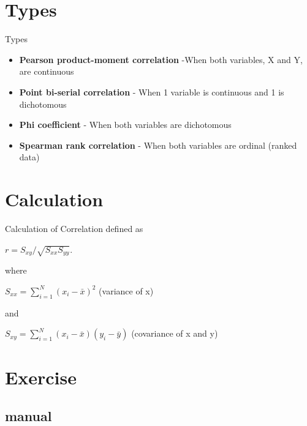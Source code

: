 \documentclass[slidestop,compress,14pt,xcolor=dvipsnames]{beamer}\usepackage[]{graphicx}\usepackage[]{color}
\begin{document}
\section{Types}
\begin{frame}{Types}
\begin{itemize}
  \item {\bf Pearson product-moment correlation} -When both variables, X and Y, are continuous
  \item {\bf Point bi-serial correlation} - When 1 variable is continuous and 1 is dichotomous
  \item {\bf Phi coefficient} - When both variables are dichotomous
  \item {\bf Spearman rank correlation} - When both variables are ordinal (ranked data)
\end{itemize}
\end{frame}


\section{Calculation}
\begin{frame}{Calculation of Correlation}
defined as \newline 
\begin{center}
$r = S_{xy}/\sqrt{S_{xx}S_{yy}}.$ 
\end{center}
where 
\begin{center} $S_{xx} = \sum\limits_{i = 1}^N {\left( {x_i - \bar x} \right)^2}$ {(variance of x)} \end{center}
and
\begin{center} 
$S_{xy} = \sum\limits_{i = 1}^N {\left( {x_i - \bar x} \right)} {\left( {y_i - \bar y} \right)}$ {(covariance of x and y)}
\end{center}
\end{frame}


\section{Exercise}
\subsection{manual}

\begingroup
\fontsize{7pt}{9pt}\selectfont
\end{document}
